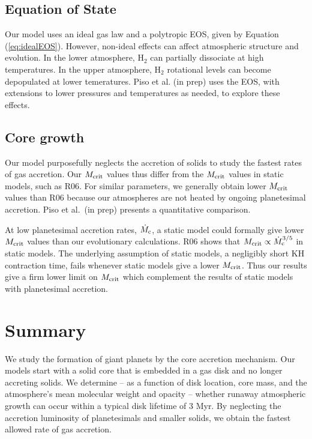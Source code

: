 \documentclass[apj, numberedappendix]{emulateapj}
\newcommand{\Eq}[1]{Equation\,(\ref{#1})}
\newcommand{\co}{_{\rm c}}
\newcommand{\MC}{M_{\rm crit}}
\begin{document}
\subsection{Equation of State}
\label{sec:EOS}
 
Our model uses an ideal gas law and a polytropic EOS, given by \Eq{eq:idealEOS}.  However, non-ideal effects can affect atmospheric structure and evolution.  In the lower atmosphere, H$_2$ can partially dissociate at high temperatures.  In the upper atmosphere, H$_2$ rotational levels can become depopulated at lower temeratures.   Piso et al. (in prep) uses the \citet{saumon95} EOS, with extensions to lower pressures and temperatures as needed, to explore these effects.

\subsection{Core growth}
\label{sec:placc}

Our model purposefully neglects the accretion of solids to study the fastest rates of gas accretion.  Our $\MC$ values thus differ from the $\MC$ values in static models, such as R06.  For similar parameters, we generally obtain lower $\MC$ values than R06 because our atmospheres are not heated by ongoing planetesimal accretion.  Piso et al.\ (in prep) presents a quantitative comparison.

At low planetesimal accretion rates, $\dot{M}\co$, a static model could formally give lower $\MC$ values than our evolutionary calculations.  R06 shows that $\MC \propto \dot{M}\co^{3/5}$ in static models.  The underlying assumption of static models, a negligibly short KH contraction time, fails whenever static models give a lower $\MC$.  Thus our results give a firm lower limit on $\MC$ which complement the results of static models with planetesimal accretion.

\section{Summary} \label{sec:conclusions}

We study the formation of giant planets by the core accretion mechanism.  Our models start with a solid core that is embedded in a gas disk and no longer accreting solids.  We determine -- as a function of disk location, core mass, and the atmosphere's mean molecular weight and opacity -- whether runaway atmospheric growth can occur within a typical disk lifetime of 3 Myr.  By neglecting the accretion luminosity of planetesimals and smaller solids, we obtain the fastest allowed rate of gas accretion.  
\end{document}
